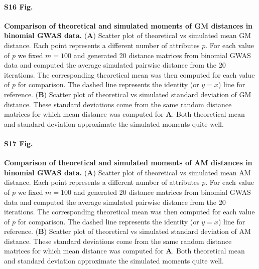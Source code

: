 \documentclass[10pt,letterpaper]{article}
\begin{document}
\paragraph*{S16 Fig.}
\label{S16_Fig}
{\bf Comparison of theoretical and simulated moments of GM distances in binomial GWAS data.} (\textbf{A}) Scatter plot of theoretical vs simulated mean GM distance. Each point represents a different number of attributes $p$. For each value of $p$ we fixed $m=100$ and generated 20 distance matrices from binomial GWAS data and computed the average simulated pairwise distance from the 20 iterations. The corresponding theoretical mean was then computed for each value of $p$ for comparison. The dashed line represents the identity (or $y=x$) line for reference. (\textbf{B}) Scatter plot of theoretical vs simulated standard deviation of GM distance. These standard deviations come from the same random distance matrices for which mean distance was computed for \textbf{A}. Both theoretical mean and standard deviation approximate the simulated moments quite well.

\paragraph*{S17 Fig.}
\label{S17_Fig}
{\bf Comparison of theoretical and simulated moments of AM distances in binomial GWAS data.} (\textbf{A}) Scatter plot of theoretical vs simulated mean AM distance. Each point represents a different number of attributes $p$. For each value of $p$ we fixed $m=100$ and generated 20 distance matrices from binomial GWAS data and computed the average simulated pairwise distance from the 20 iterations. The corresponding theoretical mean was then computed for each value of $p$ for comparison. The dashed line represents the identity (or $y=x$) line for reference. (\textbf{B}) Scatter plot of theoretical vs simulated standard deviation of AM distance. These standard deviations come from the same random distance matrices for which mean distance was computed for \textbf{A}. Both theoretical mean and standard deviation approximate the simulated moments quite well.
\end{document}
